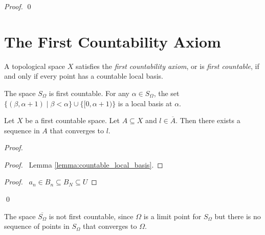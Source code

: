 \begin{proof}
    \pf
    \qed
\end{proof}

\section{The First Countability Axiom}

\begin{definition}
    A topological space $X$ satisfies the \emph{first countability axiom}, or is \emph{first countable}, if and only if every point has a countable local basis.
\end{definition}

\begin{example}
    The space $S_\Omega$ is first countable. For any $\alpha \in S_\Omega$,
    the set $\{ (\beta, \alpha + 1) \mid \beta < \alpha \} \cup \{ [0, \alpha + 1) \}$
    is a local basis at $\alpha$.
\end{example}

\begin{lemma}
    Let $X$ be a first countable space. Let $A \subseteq X$ and $l \in \overline{A}$.
    Then there exists a sequence in $A$ that converges to $l$.
\end{lemma}

\begin{proof}
    \pf
    \begin{proof}
        \pf\ Lemma \ref{lemma:countable_local_basis}.
    \end{proof}
    \begin{proof}
        \pf\ $a_n \in B_n \subseteq B_N \subseteq U$
    \end{proof}
    \qed
\end{proof}

\begin{example}
    \label{example:S_Omega_bar_not_first_countable}
    The space $\overline{S_\Omega}$ is not first countable, since $\Omega$
    is a limit point for $S_\Omega$ but there is no sequence of points in
    $S_\Omega$ that converges to $\Omega$.
\end{example}


